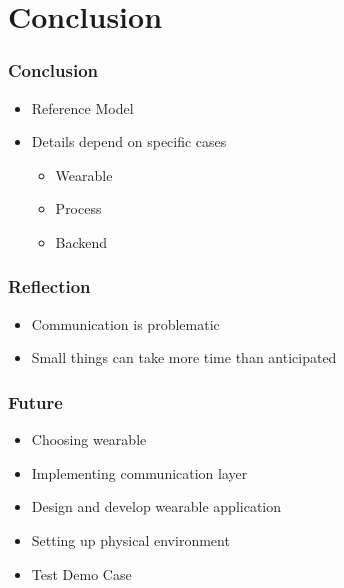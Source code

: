 \section{Conclusion}
\begin{frame}\frametitle{Conclusion}
	\begin{itemize}
		\item Reference Model
		\item Details depend on specific cases
		\begin{itemize}
			\item Wearable
			\item Process
			\item Backend
		\end{itemize}
	\end{itemize}
\end{frame}
\begin{frame}\frametitle{Reflection}
	\begin{itemize}
		\item Communication is problematic
		\item Small things can take more time than anticipated
	\end{itemize}
\end{frame}
\begin{frame}\frametitle{Future}
	\begin{itemize}
		\item Choosing wearable
		\item Implementing communication layer
		\item Design and develop wearable application
		\item Setting up physical environment
		\item Test Demo Case
	\end{itemize}
\end{frame}